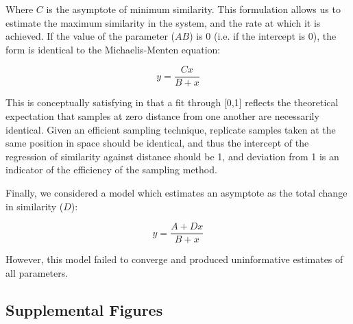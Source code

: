 \documentclass[11pt,letterpaper]{article} %
\begin{document}
Where $C$ is the asymptote of minimum similarity. This formulation allows us to estimate the maximum similarity in the system, and the rate at which it is achieved. If the value of the parameter ($AB$) is 0 (i.e. if the intercept is 0), the form is identical to the Michaelis-Menten equation:


\begin{equation}\label{MichaelisMenten}
	y = \frac{Cx}{B + x}
\end{equation}


This is conceptually satisfying in that a fit through [0,1] reflects the theoretical expectation that samples at zero distance from one another are necessarily identical. Given an efficient sampling technique, replicate samples taken at the same position in space should be identical, and thus the intercept of the regression of similarity against distance should be 1, and deviation from 1 is an indicator of the efficiency of the sampling method. %


Finally, we considered a model which estimates an asymptote as the total change in similarity ($D$):

\begin{equation}\label{Harold}
	y = \frac{A + Dx}{B + x}
\end{equation}

However, this model failed to converge and produced uninformative estimates of all parameters.


\subsection*{Supplemental Figures}
\end{document}
